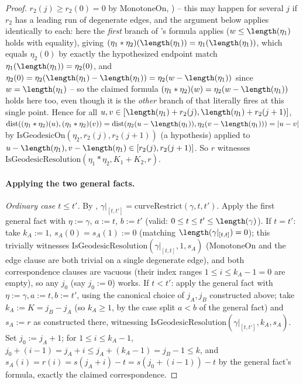\begin{proof}
  $r_2(j)\ge r_2(0)=0$ by $\mathrm{MonotoneOn}$, ) -- this may happen
  for several $j$ if $r_2$ has a leading run of degenerate edges, and the argument below applies
  identically to each: here the \emph{first} branch of 's formula applies
  ($w\le\length(\eta_1)$ holds with equality), giving
  $(\eta_1*\eta_2)(\length(\eta_1))=\eta_1(\length(\eta_1))$, which equals $\eta_2(0)$ by exactly
  the hypothesized endpoint match $\eta_1(\length(\eta_1))=\eta_2(0)$, and
  $\eta_2(0)=\eta_2(\length(\eta_1)-\length(\eta_1))=\eta_2(w-\length(\eta_1))$ since
  $w=\length(\eta_1)$ -- so the claimed formula $(\eta_1*\eta_2)(w)=\eta_2(w-\length(\eta_1))$ holds
  here too, even though it is the \emph{other} branch of  that literally fires
  at this single point. Hence for all
  $u,v\in[\length(\eta_1)+r_2(j),\length(\eta_1)+r_2(j+1)]$,
  $\mathrm{dist}((\eta_1*\eta_2)(u),(\eta_1*\eta_2)(v)) =
  \mathrm{dist}(\eta_2(u-\length(\eta_1)),\eta_2(v-\length(\eta_1))) = |u-v|$ by
  $\mathrm{IsGeodesicOn}(\eta_2,r_2(j),r_2(j+1))$ (a hypothesis) applied to
  $u-\length(\eta_1),v-\length(\eta_1)\in[r_2(j),r_2(j+1)]$. So $r$ witnesses
  $\mathrm{IsGeodesicResolution}(\eta_1*\eta_2,K_1+K_2,r)$.

  \paragraph{Applying the two general facts.}

  \emph{Ordinary case $t \le t'$.} By , $\gamma|_{[t,t']} =
  \mathrm{curveRestrict}(\gamma,t,t')$. Apply the first general fact with $\eta:=\gamma$, $a:=t$,
  $b:=t'$ (valid: $0\le t\le t'\le\length(\gamma)$). If $t=t'$: take $k_A:=1$, $s_A(0)=s_A(1):=0$
  (matching $\length(\gamma|_{[t,t]})=0$); this trivially witnesses
  $\mathrm{IsGeodesicResolution}(\gamma|_{[t,t]},1,s_A)$ ($\mathrm{MonotoneOn}$ and the edge clause
  are both trivial on a single degenerate edge), and both correspondence clauses are vacuous (their
  index ranges $1\le i\le k_A-1=0$ are empty), so any $j_0$ (say $j_0:=0$) works. If $t<t'$: apply
  the general fact with $\eta:=\gamma,a:=t,b:=t'$, using the canonical choice of $j_A,j_B$
  constructed above; take $k_A:=K=j_B-j_A$ (so $k_A\ge1$, by the case split $a<b$ of the general
  fact) and $s_A:=r$ as constructed there, witnessing
  $\mathrm{IsGeodesicResolution}(\gamma|_{[t,t']},k_A,s_A)$. Set $j_0:=j_A+1$; for $1\le i\le
  k_A-1$, $j_0+(i-1)=j_A+i \le j_A+(k_A-1)=j_B-1\le k$, and $s_A(i)=r(i)=
  s(j_A+i)-t=s(j_0+(i-1))-t$ by the general fact's formula, exactly the claimed correspondence.


\end{proof}

